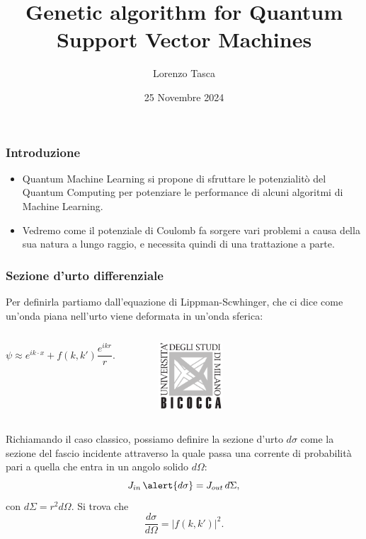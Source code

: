 \documentclass{beamer}
\title[Genetic algorithm for QSVM] 
{Genetic algorithm for Quantum Support Vector Machines}
\author[Lorenzo Tasca]
{Lorenzo Tasca}
\date[25/11/2024] 
{25 Novembre 2024}
\begin{document}
\frame{\titlepage}




\begin{frame}
\frametitle{Introduzione}
    \begin{itemize}
    \item<1-> Quantum Machine Learning si propone di sfruttare le potenzialitò del
    Quantum Computing per potenziare le performance di alcuni algoritmi di Machine Learning. 
        \item<2-> Vedremo come il potenziale di Coulomb fa sorgere vari problemi a causa della sua natura a lungo raggio, e necessita quindi di una trattazione a parte.
        \end{itemize}
\end{frame}

\begin{frame}
\frametitle{Sezione d'urto differenziale}



   
 Per definirla partiamo dall'equazione di Lippman-Scwhinger, che ci dice come un'onda piana nell'urto viene deformata in un'onda sferica:
\begin{columns}
  $$\psi\approx e^{ik\cdot x}+f(k,k')\frac{e^{ikr}}{r}.$$


\begin{figure}
      \includegraphics[height=2.5cm]{logo.png}
 \end{figure}


\end{columns}
\vspace{4mm}
    Richiamando il caso classico, possiamo definire la sezione d'urto $d\sigma$ come la sezione del fascio incidente attraverso la quale passa una corrente di probabilità pari a quella che entra in un angolo solido $d\Omega$:  $$J_{in}\,\alert{d\sigma}=J_{out}\,d\Sigma,$$ con $d\Sigma=r^2d\Omega$.
    Si trova che  $$\frac{{d\sigma}}{d\Omega}=|f(k,k')|^2.$$

\end{frame}
\end{document}
